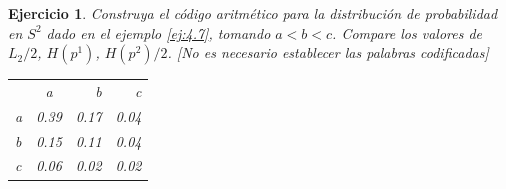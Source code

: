 \documentclass{beamer}
\theoremstyle{plain}
\theoremstyle{example}
\newtheorem{ejercicio} [Ejercicio]{Ejercicio}
\theoremstyle{example}
\begin{document}
\begin{frame}  \footnotesize

\begin{ejercicio}
Construya el código aritmético para la distribución de probabilidad en $S^2$ dado en el ejemplo \ref{ej:4.7}, tomando $a< b < c$.
Compare los valores de $L_2/2$, $H(p^1)$, $H(p^2)/2$. [No es necesario establecer las palabras codificadas]

\begin{center}
 \begin{tabular}{ l c r r}
         & a & b & c\\
   a & 0.39 & 0.17 & 0.04 \\
   b & 0.15 & 0.11 & 0.04 \\
   c & 0.06 & 0.02 & 0.02 \\
 \end{tabular}
\end{center}

\end{ejercicio}
\end{frame} 
\end{document}
